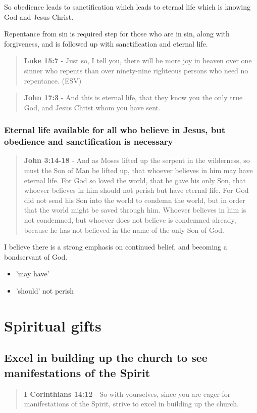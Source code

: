 \documentclass[11pt]{article}
\begin{document}
So obedience leads to sanctification which leads to eternal life which is knowing God and Jesus Christ.

Repentance from sin is required step for those who are in sin, along with forgiveness, and is followed up with sanctification and eternal life.

\begin{quote}
\textbf{Luke 15:7} - Just so, I tell you, there will be more joy in heaven over one sinner who repents than over ninety-nine righteous persons who need no repentance. (ESV)
\end{quote}

\begin{quote}
\textbf{John 17:3} - And this is eternal life, that they know you the only true God, and Jesus Christ whom you have sent.
\end{quote}

\subsubsection{Eternal life \textbf{available} for all who believe in Jesus, but obedience and sanctification is necessary}
\label{sec:org29bfdf7}


\begin{quote}
\textbf{John 3:14-18} - And as Moses lifted up the serpent in the wilderness, so must the Son of Man be lifted up, that whoever believes in him may have eternal life. For God so loved the world, that he gave his only Son, that whoever believes in him should not perish but have eternal life. For God did not send his Son into the world to condemn the world, but in order that the world might be saved through him. Whoever believes in him is not condemned, but whoever does not believe is condemned already, because he has not believed in the name of the only Son of God.
\end{quote}

I believe there is a strong emphasis on continued belief, and becoming a bondservant of God.
\begin{itemize}
\item 'may have'
\item 'should' not perish
\end{itemize}

\section{Spiritual gifts}
\label{sec:org9745b42}
\subsection{Excel in building up the church to see manifestations of the Spirit}
\label{sec:org57c7839}
\begin{quote}
\textbf{I Corinthians 14:12} - So with yourselves, since you are eager for manifestations of the Spirit, strive to excel in building up the church.
\end{quote}
\end{document}

